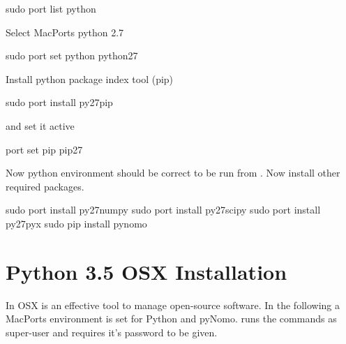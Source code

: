 \documentclass[a4paper,11pt,english]{sphinxmanual}
\begin{document}
\begin{sphinxVerbatim}[commandchars=\\\{\},formatcom=\scriptsize]
\PYGZdl{} sudo port  \PYGZhy{}\PYGZhy{}list python
\end{sphinxVerbatim}

Select MacPorts python 2.7

\begin{sphinxVerbatim}[commandchars=\\\{\},formatcom=\scriptsize]
\PYGZdl{} sudo port  \PYGZhy{}\PYGZhy{}set python python27
\end{sphinxVerbatim}

Install python package index tool (pip)

\begin{sphinxVerbatim}[commandchars=\\\{\},formatcom=\scriptsize]
\PYGZdl{} sudo port install py27\PYGZhy{}pip
\end{sphinxVerbatim}

and set it active

\begin{sphinxVerbatim}[commandchars=\\\{\},formatcom=\scriptsize]
\PYGZdl{} port  \PYGZhy{}\PYGZhy{}set pip pip27
\end{sphinxVerbatim}

Now python environment should be correct to be run from . Now install other required packages.

\begin{sphinxVerbatim}[commandchars=\\\{\},formatcom=\scriptsize]
\PYGZdl{} sudo port install py27\PYGZhy{}numpy
\PYGZdl{} sudo port install py27\PYGZhy{}scipy
\PYGZdl{} sudo port install py27\PYGZhy{}pyx
\PYGZdl{} sudo pip install pynomo
\end{sphinxVerbatim}


\section{Python 3.5 OSX Installation}
\label{\detokenize{installation/installation:python-3-5-osx-installation}}
In OSX  is an effective tool to manage open-source software. In the following a
MacPorts environment is set for Python and pyNomo.  runs the commands as super-user and requires it’s password to be given.
\end{document}
